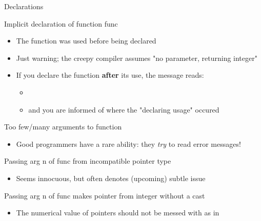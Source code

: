 \begin{frame}[fragile]{Declarations}
  \begin{block}{Implicit declaration of function func}
    \begin{itemize}
    \item The function was used before being declared
    \item Just warning; the creepy compiler assumes "no parameter, returning integer"


    \item If you declare the function \textbf{after} its use, the message reads:
      \begin{itemize}
      \item[] 
      \item and you are informed of where the "declaring usage" occured
      \end{itemize}
    \end{itemize}
  \end{block}

  \begin{block}{Too few/many arguments to function}
    \begin{itemize}
    \item Good programmers have a rare ability: they \textit{try} to read error
      messages!
    \end{itemize}
  \end{block}

  \begin{block}{Passing arg n of func from incompatible pointer type}
    \begin{itemize}
    \item Seems innocuous, but often denotes (upcoming) subtle issue
    \end{itemize}
  \end{block}

  \begin{block}{Passing arg n of func makes pointer from integer without a cast}
    \begin{itemize}
    \item The numerical value of pointers should not be messed with as in 

    \end{itemize}
  \end{block}
\end{frame}

